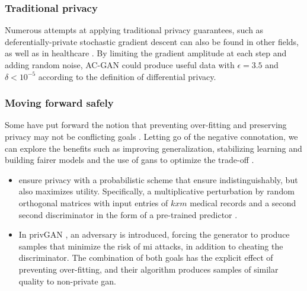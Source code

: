         \subsubsection{Traditional privacy}
        
            Numerous attempts at applying traditional privacy guarantees, such as deferentially-private stochastic gradient descent can also be found in other fields, as well as in healthcare \cite{Beaulieu-Jones2019-ct, esteban2017real,chincheong2020generation, BaeAnomiGAN2020}. By limiting the gradient amplitude at each step and adding random noise, AC-GAN could produce useful data with $\epsilon=3.5$ and $\delta<10^{-5}$ according to the definition of differential privacy. \par 
        
        \subsubsection{Moving forward safely}
        
            Some have put forward the notion that preventing over-fitting and preserving privacy may not be conflicting goals \cite{Wu2019-ui,Mukherjee2019-vu,Zhu2020-oj}. Letting go of the negative connotation, we can explore the benefits such as improving generalization, stabilizing learning and building fairer models \cite{Zhu2020-oj} and the use of \glspl{gan} to optimize the trade-off \cite{Chen2019-mh}.\par
            
            \begin{itemize}
                \item \citeauthor{BaeAnomiGAN2020} ensure privacy with a probabilistic scheme that ensure indistinguishably, but also maximizes utility. Specifically, a multiplicative perturbation by random orthogonal matrices with input entries of $k x m$ medical records and a second second discriminator in the form of a pre-trained predictor \cite{BaeAnomiGAN2020}.
                \item In privGAN \cite{Mukherjee2019-vu}, an adversary is introduced, forcing the generator to produce samples that minimize the risk of \gls{mi} attacks, in addition to cheating the discriminator. The combination of both goals has the explicit effect of preventing over-fitting, and their algorithm produces samples of similar quality to non-private \gls{gan}.
            \end{itemize}

